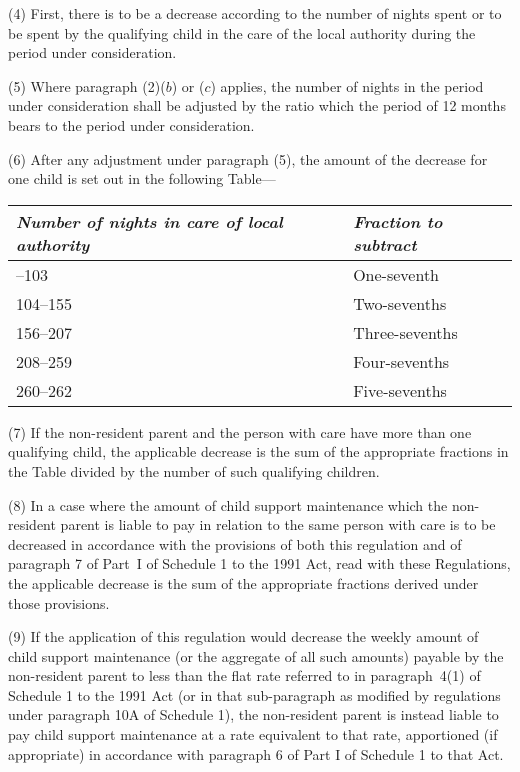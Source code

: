 \documentclass[12pt,a4paper]{article}
\begin{document}
(4) First, there is to be a decrease according to the number of nights spent or to be spent by the qualifying child in the care of the local authority during the period under consideration.

(5) Where paragraph (2)($b$)  or ($c$)  applies, the number of nights in the period under consideration shall be adjusted by the ratio which the period of 12 months bears to the period under consideration.

(6) After any adjustment under paragraph (5), the amount of the decrease for one child is set out in the following Table—

\noindent
\begin{longtable}{ll}
\hline
\itshape Number of nights in care of local authority	&\itshape Fraction to subtract\\
\hline
\endhead
\hline
\endlastfoot
52--103	&One-seventh\\
104--155	&Two-sevenths\\
156--207	&Three-sevenths\\
208--259	&Four-sevenths\\
260--262	&Five-sevenths\\
\end{longtable}

(7) If the non-resident parent and the person with care have more than one qualifying child, the applicable decrease is the sum of the appropriate fractions in the Table divided by the number of such qualifying children.

(8) In a case where the amount of child support maintenance which the non-resident parent is liable to pay in relation to the same person with care is to be decreased in accordance with the provisions of both this regulation and of paragraph 7 of Part~I of Schedule 1 to the 1991 Act, read with these Regulations, the applicable decrease is the sum of the appropriate fractions derived under those provisions.

(9) If the application of this regulation would decrease the weekly amount of child support maintenance (or the aggregate of all such amounts) payable by the non-resident parent to less than the flat rate referred to in paragraph~4(1) of Schedule 1 to the 1991 Act (or in that sub-paragraph as modified by regulations under paragraph 10A of Schedule 1), the non-resident parent is instead liable to pay child support maintenance at a rate equivalent to that rate, apportioned (if appropriate) in accordance with paragraph 6 of Part I of Schedule 1 to that Act.
\end{document}
